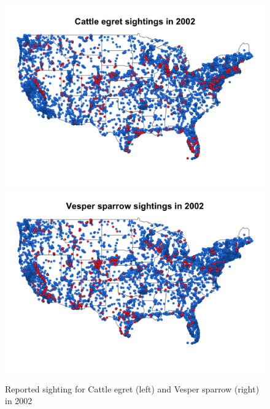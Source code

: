 \documentclass[11pt]{article}
\begin{document}
\begin{figure}
  \centering
  \includegraphics[width=0.47\linewidth]{plots/cattle_egret.png}
  \includegraphics[width=0.47\linewidth]{plots/vesper_sparrow.png}
  \caption{Reported sighting for Cattle egret (left) and Vesper sparrow (right) in 2002}
  \label{fig:data2002}
\end{figure}
\end{document}
